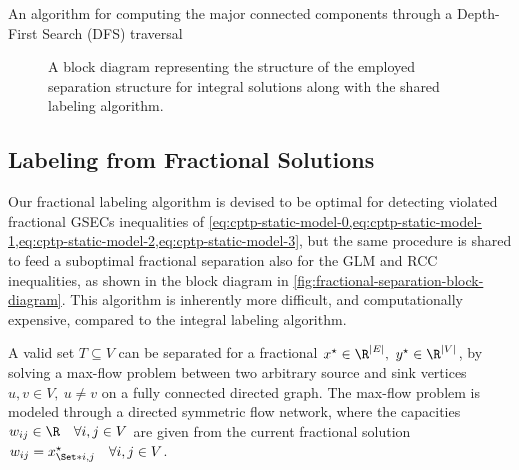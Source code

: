 \begin{algorithm}
	\caption{An algorithm for computing the major connected components through a Depth-First Search (DFS) traversal}
	
	\label{algo:cc-dfs}
\end{algorithm}

\begin{figure}[ht]
	\centering
	\caption{A block diagram representing the structure
		of the employed separation structure for integral solutions
		along with the shared labeling algorithm.
	}
	\label{fig:integral-separation-block-diagram}
\end{figure}

\subsection{Labeling from Fractional Solutions}
\label{sec:impl-labeling-fractional-solutions}

Our fractional labeling algorithm is devised to be optimal for
detecting violated fractional GSECs inequalities
of \cref{eq:cptp-static-model-0,eq:cptp-static-model-1,eq:cptp-static-model-2,eq:cptp-static-model-3},
but the same procedure is shared
to feed a suboptimal fractional separation also for the GLM and RCC inequalities,
as shown in the block diagram in \cref{fig:fractional-separation-block-diagram}.
This algorithm is inherently more difficult, and computationally expensive,
compared to the integral labeling algorithm.

A valid set $T \subseteq V$ can be separated for a fractional $x^\star \in \R^{|E|},\ y^\star \in \R^{|V|}$,
by solving a
max-flow problem between two arbitrary source and sink vertices $u, v \in V,\ u \ne v$ on a fully connected directed graph.
The max-flow problem is modeled through a directed symmetric flow network,
where the capacities $w_{ij} \in \R \quad \forall i, j \in V$
are given from the current fractional solution $w_{ij} = x^\star_{\Set*{i, j}} \quad \forall i, j \in V$.

